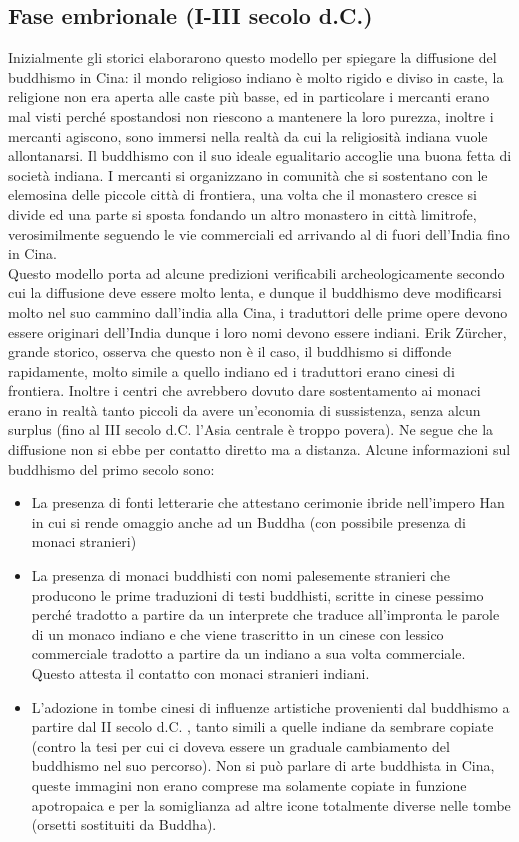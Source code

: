 \documentclass[10pt,a4paper]{report}
\begin{document}
\subsection{Fase embrionale (I-III secolo d.C.)}
Inizialmente gli storici elaborarono questo modello per spiegare la diffusione del buddhismo in Cina: il mondo religioso indiano è molto rigido e diviso in caste, la religione non era aperta alle caste più basse, ed in particolare i mercanti erano mal visti perché spostandosi non riescono a mantenere la loro purezza, inoltre i mercanti agiscono, sono immersi nella realtà da cui la religiosità indiana vuole allontanarsi. Il buddhismo con il suo ideale egualitario accoglie una buona fetta di società indiana. I mercanti si organizzano in comunità che si sostentano con le elemosina delle piccole città di frontiera, una volta che il monastero cresce si divide ed una parte si sposta fondando un altro monastero in città limitrofe, verosimilmente seguendo le vie commerciali ed arrivando al di fuori dell'India fino in Cina.\\
Questo modello porta ad alcune predizioni verificabili archeologicamente secondo cui la diffusione deve essere molto lenta, e dunque il buddhismo deve modificarsi molto nel suo cammino dall'india alla Cina, i traduttori delle prime opere devono essere originari dell'India dunque i loro nomi devono essere indiani. Erik Z\"{u}rcher, grande storico, osserva che questo non è il caso, il buddhismo si diffonde rapidamente, molto simile a quello indiano ed i traduttori erano cinesi di frontiera. Inoltre i centri che avrebbero dovuto dare sostentamento ai monaci erano in realtà tanto piccoli da avere un'economia di sussistenza, senza alcun surplus (fino al III secolo d.C. l'Asia centrale è troppo povera). Ne segue che la diffusione non si ebbe per contatto diretto ma a distanza. Alcune informazioni sul buddhismo del primo secolo sono: 
\begin{itemize}
	\item La presenza di fonti letterarie che attestano cerimonie ibride nell'impero Han in cui si rende omaggio anche ad un Buddha (con possibile presenza di monaci stranieri) 
	\item La presenza di monaci buddhisti con nomi palesemente stranieri che producono le prime traduzioni di testi buddhisti, scritte in cinese pessimo perché tradotto a partire da un interprete che traduce all'impronta le parole di un monaco indiano e che viene trascritto in un cinese con lessico commerciale tradotto a partire da un indiano a sua volta commerciale. Questo attesta il contatto con monaci stranieri indiani.
	\item L'adozione in tombe cinesi di influenze artistiche provenienti dal buddhismo a partire dal II secolo d.C. , tanto simili a quelle indiane da sembrare copiate (contro la tesi per cui ci doveva essere un graduale cambiamento del buddhismo nel suo percorso). Non si può parlare di arte buddhista in Cina, queste immagini non erano comprese ma solamente copiate in funzione apotropaica e per la somiglianza ad altre icone totalmente diverse nelle tombe (orsetti sostituiti da Buddha).
\end{itemize}
\end{document}
